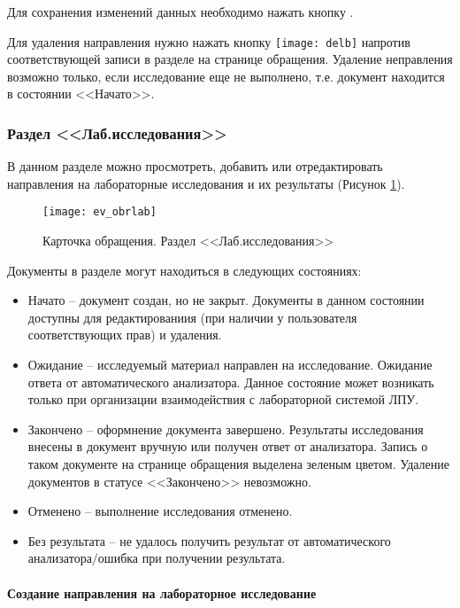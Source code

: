 {{Для сохранения изменений данных необходимо нажать кнопку .

Для удаления направления нужно нажать кнопку \texttt{[image: delb]} напротив соответствующей записи в разделе  на странице обращения. Удаление неправления возможно только, если исследование еще не выполнено, т.е. документ находится в состоянии <<Начато>>.
}{}

\subsubsection{Раздел <<Лаб.исследования>>}

В данном разделе можно просмотреть, добавить или отредактировать направления на лабораторные исследования и их результаты (Рисунок \ref{img_ev_obrlab}).

\begin{figure}[ht]\centering
 \texttt{[image: ev\_obrlab]}
 \caption{Карточка обращения. Раздел <<Лаб.исследования>>}
 \label{img_ev_obrlab}
\end{figure}

Документы  в разделе  могут находиться в следующих состояниях:
\begin{itemize}
 \item Начато -- документ создан, но не закрыт. Документы в данном состоянии доступны для редактированиия (при наличии у пользователя соответствующих прав) и удаления. 
 \item Ожидание -- исследуемый материал направлен на исследование. Ожидание ответа от автоматического анализатора. Данное состояние может возникать только при организации взаимодействия \tmis с лабораторной системой ЛПУ.
 \item Закончено -- оформнение документа завершено. Результаты исследования внесены в документ вручную или получен ответ от анализатора. Запись о таком документе на странице обращения выделена зеленым цветом. Удаление документов в статусе <<Закончено>> невозможно.
 \item Отменено -- выполнение исследования отменено.
 \item Без результата -- не удалось получить результат от автоматического анализатора$\slash$ошибка при получении результата.
\end{itemize}

\paragraph{Создание направления на лабораторное исследование}

}
